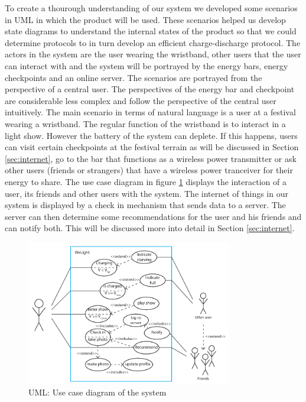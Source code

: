 %
To create a thourough understanding of our system we developed some scenarios in UML in which the product will be used. These scenarios helped us develop state diagrams to understand the internal states of the product so that we could determine protocols to in turn develop an efficient charge-discharge protocol. The actors in the system are the user wearing the wristband, other users that the user can interact with and the system will be portrayed by the energy bars, energy checkpoints and an online server. The scenarios are portrayed from the perspective of a central user. The perspectives of the energy bar and checkpoint are considerable less complex and follow the perspective of the central user intuitively. The main scenario in terms of natural language is a user at a festival wearing a wristband. The regular function of the wristband is to interact in a light show. However the battery of the system can deplete. If this happens, users can visit certain checkpoints at the festival terrain as will be discussed in Section \ref{sec:internet}, go to the bar that functions as a wireless power transmitter or ask other users (friends or strangers) that have a wireless power tranceiver for their energy to share. The use case diagram in figure \ref{fig:usecase} displays the interaction of a user, its friends and other users with the system. The internet of things in our system is displayed by a check in mechanism that sends data to a server. The server can then determine some recommendations for the user and his friends and can notify both. This will be discussed more into detail in Section \ref{sec:internet}.
%
\begin{figure}[h!]
\centering
\includegraphics[width=0.8\textwidth]{usecase.pdf}
\caption{UML: Use case diagram of the system}
\label{fig:usecase}
\end{figure}

